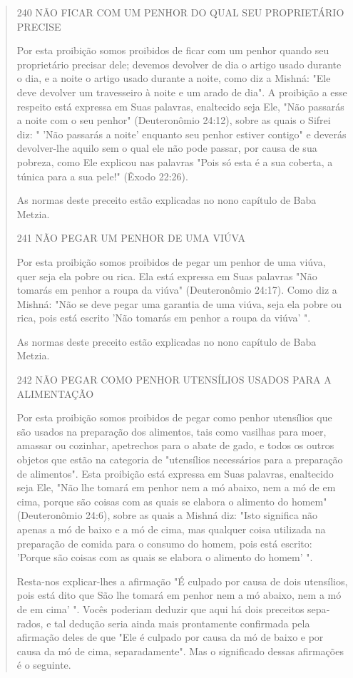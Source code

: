 \begin{quote}
240 NÃO FICAR COM UM PENHOR DO QUAL SEU PROPRIETÁRIO PRECISE

Por esta proibição somos proibidos de ficar com um penhor quan­do seu
proprietário precisar dele; devemos devolver de dia o artigo usado
du­rante o dia, e a noite o artigo usado durante a noite, como diz a
Mishná: "Ele deve devolver um travesseiro à noite e um arado de dia". A
proibição a esse respeito está expressa em Suas palavras, enaltecido
seja Ele, "Não passarás a noite com o seu penhor" (Deuteronômio 24:12),
sobre as quais o Sifrei diz: " 'Não passarás a noite' enquanto seu
penhor estiver contigo" e deverás devolver-lhe aquilo sem o qual ele não
pode passar, por causa de sua pobreza, como Ele explicou nas palavras
"Pois só esta é a sua coberta, a túnica para a sua pele!" (Êxodo 22:26).

As normas deste preceito estão explicadas no nono capítulo de Baba
Metzia.

241 NÃO PEGAR UM PENHOR DE UMA VIÚVA

Por esta proibição somos proibidos de pegar um penhor de uma viú­va,
quer seja ela pobre ou rica. Ela está expressa em Suas palavras "Não
tomarás em penhor a roupa da viúva" (Deuteronômio 24:17). Como diz a
Mishná: "Não se deve pegar uma garantia de uma viúva, seja ela pobre ou
rica, pois está escri­to 'Não tomarás em penhor a roupa da viúva' ".

As normas deste preceito estão explicadas no nono capítulo de Baba
Metzia.

242 NÃO PEGAR COMO PENHOR UTENSÍLIOS USADOS PARA A ALIMENTAÇÃO

Por esta proibição somos proibidos de pegar como penhor utensí­lios que
são usados na preparação dos alimentos, tais como vasilhas para moer,
amassar ou cozinhar, apetrechos para o abate de gado, e todos os outros
obje­tos que estão na categoria de "utensílios necessários para a
preparação de ali­mentos". Esta proibição está expressa em Suas
palavras, enaltecido seja Ele, "Não lhe tomará em penhor nem a mó
abaixo, nem a mó de em cima, porque são coisas com as quais se elabora o
alimento do homem" (Deuteronômio 24:6), sobre as quais a Mishná diz:
"Isto significa não apenas a mó de baixo e a mó de cima, mas qualquer
coisa utilizada na preparação de comida para o consu­mo do homem, pois
está escrito: 'Porque são coisas com as quais se elabora o alimento do
homem' ".

Resta-nos explicar-lhes a afirmação "É culpado por causa de dois
uten­sílios, pois está dito que São lhe tomará em penhor nem a mó
abaixo, nem a mó de em cima' ". Vocês poderiam deduzir que aqui há dois
preceitos sepa­rados, e tal dedução seria ainda mais prontamente
confirmada pela afirmação deles de que "Ele é culpado por causa da mó de
baixo e por causa da mó de cima, separadamente". Mas o significado
dessas afirmações é o seguinte.


\end{quote}
